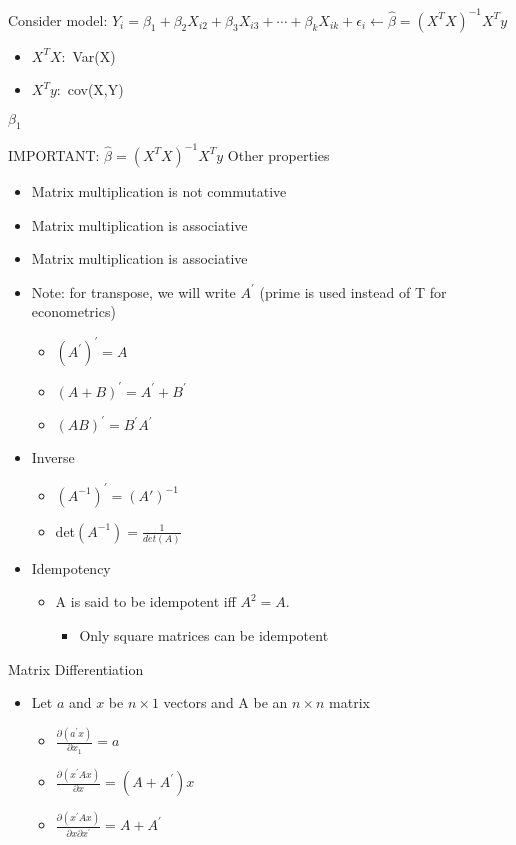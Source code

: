 \documentclass[10pt, oneside]{article}
\begin{document}
Consider model: $Y_i = \beta_1 + \beta_2 X_{i2} + \beta_3 X_{i3} + \cdots + \beta_k X_{ik} + \epsilon_i \leftarrow \hat \beta = (X^T X) ^{-1} X^T y$
\begin{itemize}
    \item $X^T X:$ Var(X)
    \item $X^T y: $ cov(X,Y)
\end{itemize}
$\beta_1$

IMPORTANT: $\hat \beta = (X^TX) ^{-1} X^T y$
Other properties
\begin{itemize}
    \item Matrix multiplication is not commutative
    \item Matrix multiplication is associative
    \item Matrix multiplication is associative
    \item Note: for transpose, we will write $A^\prime$ (prime is used instead of T for econometrics)
    \begin{itemize}
        \item $(A^\prime)^\prime = A$
        \item $(A+B)^\prime = A^\prime + B^\prime$
        \item $(AB)^\prime = B^\prime A^\prime$
    \end{itemize}
    \item Inverse
    \begin{itemize}
        \item $(A^{-1})^\prime = (A\prime)^{-1}$
        \item det$(A^{-1}) = \frac{1}{det(A)}$
    \end{itemize}
    \item Idempotency
    \begin{itemize}
        \item A is said to be idempotent iff $A^2 = A$.
        \begin{itemize}
            \item Only square matrices can be idempotent
        \end{itemize}
    \end{itemize}
\end{itemize}
Matrix Differentiation
\begin{itemize}
    \item Let $a$ and $x$ be $n\times 1$ vectors and A be an $n\times n$ matrix
    \begin{itemize}
        \item $\frac{\partial (a^\prime x)}{\partial x_1} = a$
        \item $\frac{\partial (x^\prime Ax)}{\partial x} = (A+A^\prime) x$
        \item $\frac{\partial (x^\prime Ax)}{\partial x \partial x^\prime} = A+A^\prime$
    \end{itemize}
\end{itemize}
\end{document}
